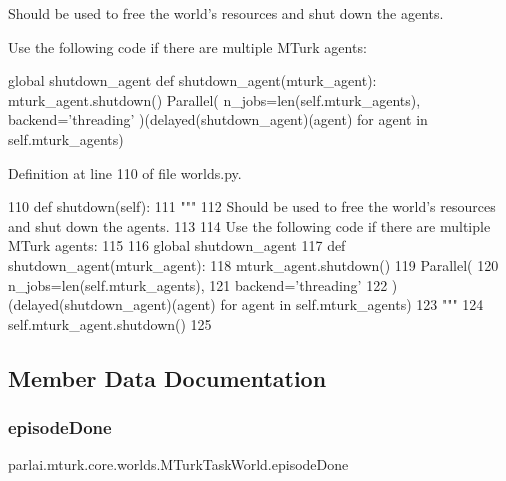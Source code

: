 \begin{DoxyVerb}Should be used to free the world's resources and shut down the agents.

Use the following code if there are multiple MTurk agents:

global shutdown_agent
def shutdown_agent(mturk_agent):
    mturk_agent.shutdown()
Parallel(
    n_jobs=len(self.mturk_agents),
    backend='threading'
)(delayed(shutdown_agent)(agent) for agent in self.mturk_agents)
\end{DoxyVerb}
 

Definition at line 110 of file worlds.\+py.


\begin{DoxyCode}
110     \textcolor{keyword}{def }shutdown(self):
111         \textcolor{stringliteral}{"""}
112 \textcolor{stringliteral}{        Should be used to free the world's resources and shut down the agents.}
113 \textcolor{stringliteral}{}
114 \textcolor{stringliteral}{        Use the following code if there are multiple MTurk agents:}
115 \textcolor{stringliteral}{}
116 \textcolor{stringliteral}{        global shutdown\_agent}
117 \textcolor{stringliteral}{        def shutdown\_agent(mturk\_agent):}
118 \textcolor{stringliteral}{            mturk\_agent.shutdown()}
119 \textcolor{stringliteral}{        Parallel(}
120 \textcolor{stringliteral}{            n\_jobs=len(self.mturk\_agents),}
121 \textcolor{stringliteral}{            backend='threading'}
122 \textcolor{stringliteral}{        )(delayed(shutdown\_agent)(agent) for agent in self.mturk\_agents)}
123 \textcolor{stringliteral}{        """}
124         self.mturk\_agent.shutdown()
125 
\end{DoxyCode}


\subsection{Member Data Documentation}
\mbox{\label{classparlai_1_1mturk_1_1core_1_1worlds_1_1MTurkTaskWorld_ab54f79ffe393a5c0bb185f61e5809522}} 
\subsubsection{\texorpdfstring{episode\+Done}{episodeDone}}
{\footnotesize\ttfamily parlai.\+mturk.\+core.\+worlds.\+M\+Turk\+Task\+World.\+episode\+Done}



